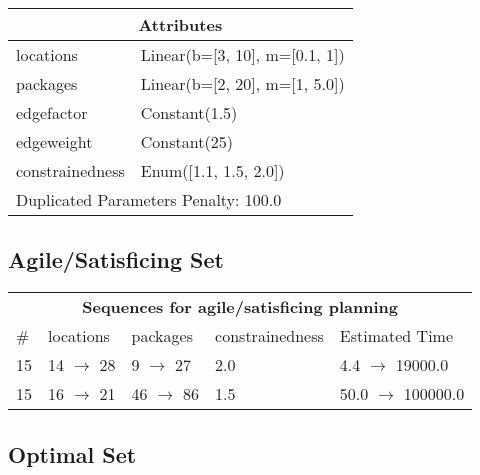 \documentclass{article}
\begin{document}
                    \begin{center}
                    \begin{tabular}{p{}p{}}
                    \multicolumn{2}{c}{\bf \large Attributes}\\\midrule
                    locations & Linear(b=[3, 10], m=[0.1, 1])\\
packages & Linear(b=[2, 20], m=[1, 5.0])\\
edgefactor & Constant(1.5)\\
edgeweight & Constant(25)\\
constrainedness & Enum([1.1, 1.5, 2.0])
                    
                     \\\midrule
                    \multicolumn{2}{l}{Duplicated Parameters Penalty: 100.0}
                    \end{tabular}
                    \end{center}
                
                         \subsection*{Agile/Satisficing Set}

                        \begin{center}
                        \begin{tabular}{l|l|l|l|l}
                        \multicolumn{5}{c}{\bf \large Sequences for agile/satisficing planning}\\
                        \# & locations & packages & constrainedness & Estimated Time\\\midrule
                        15&14 $\rightarrow$ 28&9 $\rightarrow$ 27&2.0&4.4 $\rightarrow$ 19000.0\\
15&16 $\rightarrow$ 21&46 $\rightarrow$ 86&1.5&50.0 $\rightarrow$ 100000.0
                        \end{tabular}
                        \end{center}
                    
                            \subsection*{Optimal Set}
\end{document}
